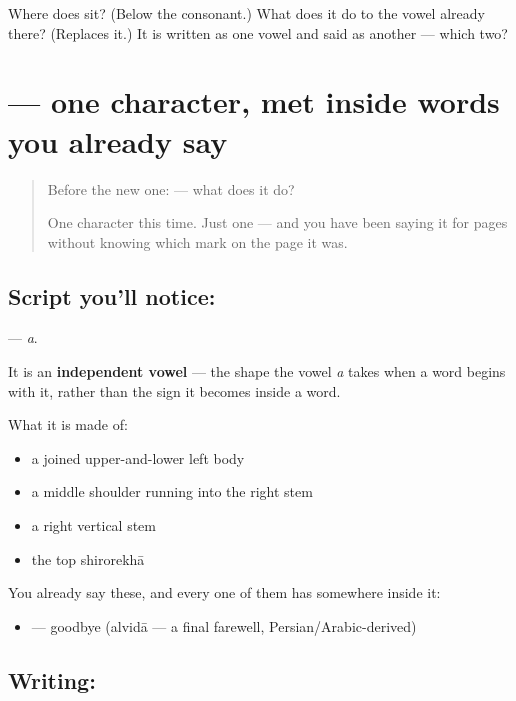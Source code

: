 \begin{tcolorbox}[breakable,colback=teal!4,colframe=teal!35!black,title={Before you move on}]
Where does \textbf{} sit? (Below the consonant.) What does it do to the vowel already there? (Replaces it.) It is written as one vowel and said as another — which two?
\end{tcolorbox}
\section[\texorpdfstring{\hi{अ} (a)}{अ (a)}]{ — one character, met inside words you already say}

\label{lesson:HI-S03-letter-a}



\begin{quote}
Before the new one:  — what does it do?

One character this time. Just one — and you have been saying it for pages without knowing which mark on the page it was.
\end{quote}

\subsection*{Script you'll notice: }
\textbf{} — \emph{a}.

It is an \textbf{independent vowel} — the shape the vowel \emph{a} takes when a word begins with it, rather than the sign it becomes inside a word.

What it is made of:

\begin{itemize}
\raggedright
  \item a joined upper-and-lower left body
  \item a middle shoulder running into the right stem
  \item a right vertical stem
  \item the top shirorekhā
\end{itemize}

You already say these, and every one of them has  somewhere inside it:

\begin{itemize}
\raggedright
  \item \textbf{} — goodbye (alvidā — a final farewell, Persian/Arabic-derived)
\end{itemize}

\subsection*{Writing: }

